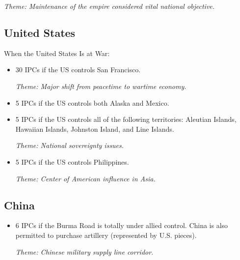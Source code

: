 \documentclass[10pt,twoside]{article}
\begin{document}
\begin{multicols*}{3}
\begin{itemize}
\textsl{Theme: Maintenance of the empire considered vital national objective.}
\end{itemize}

\subsection*{United States}
When the United States Is at War:
\begin{itemize}
\item 30 IPCs if the US controls San Francisco.

\textsl{Theme: Major shift from peacetime to wartime economy.}
\item 5 IPCs if the US controls both Alaska and Mexico.
\item 5 IPCs if the US controls all of the following territories: Aleutian Islands, Hawaiian Islands, Johnston Island, and Line Islands.

\textsl{Theme: National sovereignty issues.}
\item 5 IPCs if the US controls Philippines. 

\textsl{Theme: Center of American influence in Asia.}
\end{itemize}

\subsection*{China}
\begin{itemize}
\item 6 IPCs if the Burma Road is totally under allied control. China is also permitted to purchase artillery (represented by U.S. pieces).

\textsl{Theme: Chinese military supply line corridor.}
\end{itemize}

\end{multicols*}
\end{document}
